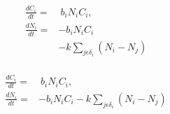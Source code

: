 \documentclass{article}
\begin{document}
\begin{subequations}
	\label{eq:5}
	\begin{align}
	\frac{dC_{i}}{dt} =&~b_{i}N_{i}C_{i},\\
	\frac{dN_{i}}{dt} =& - b_{i}N_{i}C_{i}\\
	 & - k\sum_{j \epsilon \delta_i}(N_{i} - N_{j})\\
	\end{align}
\end{subequations}

\begin{subequations}
	\label{eq:5}
	\begin{align}
	\frac{dC_{i}}{dt} =&~b_{i}N_{i}C_{i},\\
	\frac{dN_{i}}{dt} =& - b_{i}N_{i}C_{i} - k\sum_{j \epsilon \delta_i}(N_{i} - N_{j})\\
	\end{align}
\end{subequations}
\end{document}
